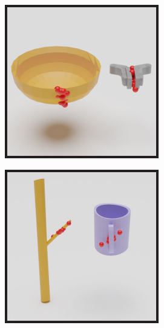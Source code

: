 \documentclass{article}
\begin{document}
\begin{figure}
    \centering
    \begin{subfigure}[b]{0.22\textwidth}
        \centering
        \includegraphics[width=\textwidth]{figures/contact_fig1.pdf}
        \caption{}
    \end{subfigure}
    \hspace{0.05\textwidth}
    \begin{subfigure}[b]{0.22\textwidth}
        \centering
        \includegraphics[width=\textwidth]{figures/contact_fig3.pdf}

\end{subfigure}
\end{figure}
\end{document}
